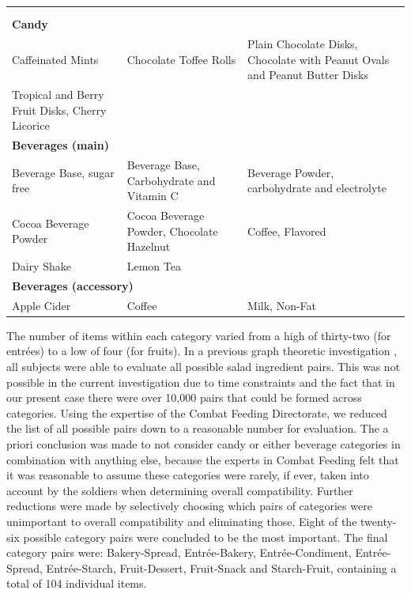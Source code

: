 \begin{landscape}
\begin{longtable}{p{7cm}p{7cm}p{7cm}}
\\
\\
\\
\multicolumn{3}{l}{\bf Candy} \\
\cmidrule(l){1-1}
Caffeinated Mints & Chocolate Toffee Rolls & Plain Chocolate Disks, Chocolate with Peanut Ovals and Peanut Butter Disks\\
Tropical and Berry Fruit Disks, Cherry Licorice\\
\midrule
\multicolumn{3}{l}{\bf Beverages (main)} \\
\cmidrule(l){1-1}
Beverage Base, sugar free & Beverage Base, Carbohydrate and Vitamin C & Beverage Powder, carbohydrate and electrolyte\\
Cocoa Beverage Powder & Cocoa Beverage Powder, Chocolate Hazelnut & Coffee, Flavored\\
Dairy Shake & Lemon Tea &\\
\midrule
\multicolumn{3}{l}{\bf Beverages (accessory)} \\
\cmidrule(l){1-1}
Apple Cider & Coffee & Milk, Non-Fat\\

\end{longtable}
\end{landscape}

The number of items within each category varied from a high of thirty-two (for entr\'{e}es) to a low of four (for fruits).  In a previous graph theoretic investigation \citep{Nestrud2010a}, all subjects were able to evaluate all possible salad ingredient pairs.  This was not possible in the current investigation due to time constraints and the fact that in our present case there were over 10,000 pairs that could be formed across categories.  Using the expertise of the Combat Feeding Directorate, we reduced the list of all possible pairs down to a reasonable number for evaluation.  The a priori conclusion was made to not consider candy or either beverage categories in combination with anything else, because the experts in Combat Feeding felt that it was reasonable to assume these categories were rarely, if ever, taken into account by the soldiers when determining overall compatibility.  Further reductions were made by selectively choosing which pairs of categories were unimportant to overall compatibility and eliminating those.  Eight of the twenty-six possible category pairs were concluded to be the most important.  The final category pairs were: Bakery-Spread, Entr\'{e}e-Bakery, Entr\'{e}e-Condiment, Entr\'{e}e-Spread, Entr\'{e}e-Starch, Fruit-Dessert, Fruit-Snack and Starch-Fruit, containing a total of 104 individual items.

